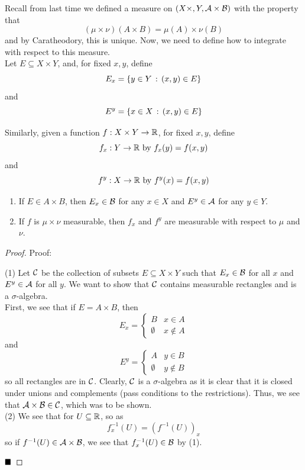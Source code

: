 
Recall from last time we defined a measure on $(X \times, Y, \cal{A} \times \cal{B})$ with the property that
\[ (\mu \times \nu)(A \times B) = \mu(A) \times \nu(B) \]
and by Caratheodory, this is unique. Now, we need to define how to integrate with respect to this measure.\\

Let $E \subseteq X \times Y$, and, for fixed $x, y$, define
\[ E_{x} = \{y \in Y \col (x, y) \in E\} \]
and
\[ E^{y} = \{x \in X \col (x, y) \in E\} \]

Similarly, given a function $f : X \times Y \to \R$, for fixed $x, y$, define
\[ f_{x} : Y \to \R \tt{ by } f_{x}(y) = f(x, y) \]
and
\[ f^{y} : X \to \R \tt{ by } f^{y}(x) = f(x, y) \]

\begin{lemma}
    \vspace{-0.6cm}
    \begin{enumerate}
        \item If $E \in A \times B$, then $E_{x} \in \cal{B}$ for any $x \in X$ and $E^{y} \in \cal{A}$ for any $y \in Y$. 
        \item If $f$ is $\mu \times \nu$ measurable, then $f_{x}$ and $f^{y}$ are measurable with respect to $\mu$ and $\nu$.
    \end{enumerate}
\end{lemma}
\begin{proof}{Proof:}
    
    (1) Let $\cal{C}$ be the collection of subsets $E \subseteq X \times Y$ such that $E_{x} \in \cal{B}$ for all $x$ and $E^{y} \in \cal{A}$ for all $y$. We want to show that $\cal{C}$ contains measurable rectangles and is a $\sigma$-algebra.\\

    First, we see that if $E = A \times B$, then 
    \[ E_{x} = \left\{\begin{matrix} B & x \in A \\ \emptyset & x \notin A\end{matrix}\right. \]
    and
    \[ E^{y} = \left\{\begin{matrix} A & y \in B \\ \emptyset & y \notin B \end{matrix}\right. \]
    so all rectangles are in $\cal{C}$. Clearly, $\cal{C}$ is a $\sigma$-algebra as it is clear that it is closed under unions and complements (pass conditions to the restrictions). Thus, we see that $\cal{A} \times \cal{B} \in \cal{C}$, which was to be shown.\\

    (2) We see that for $U \subseteq \R$, so as
    \[ f_{x}^{-1}(U) = (f^{-1}(U))_{x}\]
    so if $f^{-1}(U) \in \cal{A} \times \cal{B}$, we see that $f_{x}^{-1}(U) \in \cal{B}$ by (1).

    $\qed$
\end{proof}

